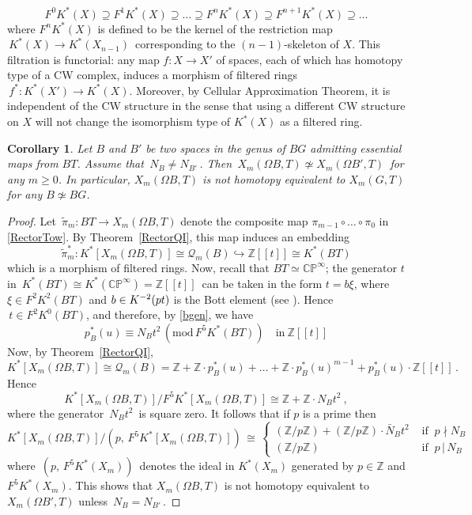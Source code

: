 \documentclass[11pt]{amsart}
\newtheorem{cor}[theorem]{Corollary}
\theoremstyle{definition}
\theoremstyle{remark}
\numberwithin{equation}{section}
\newcommand{\la}{\label}
\def\bP{\mathbb P}
\def\c{\mathbb{C}}
\def\cQ{\mathcal{Q}}
\def\Z{\mathbb{Z}}
\begin{document}
$$ F^0K^{\ast}(X) \supseteq F^1K^*(X) \supseteq \ldots \supseteq F^nK^*(X) \supseteq F^{n+1}K^*(X) \supseteq \ldots 
$$
%
where $F^n K^{\ast}(X)$ is defined to be the kernel of the restriction map $\,K^{\ast}(X) \to K^{\ast}(X_{n-1})\,$ corresponding to the $(n-1)$-skeleton of $X$. This filtration is functorial: any map $f: X \to X'$  of spaces, each of which has homotopy type of a CW complex, induces a morphism of filtered rings $\,f^\ast:K^{\ast}(X') \to K^{\ast}(X)$. Moreover, by  Cellular Approximation Theorem, it is independent of the CW structure in the sense that using a different CW structure on $X$ will not change the isomorphism type of $K^*(X)$ as a filtered ring.

\begin{cor} 
\la{rsdistinct}
Let $B$ and $B'$ be two spaces in the genus of $BG$ admitting essential maps from $ BT $. Assume that
$\,N_B \neq N_{B'}\,$. Then $\,X_m(\Omega B, T) \not\simeq X_m(\Omega B', T)\,$ for any $m \geq 0$. 
In particular, $ X_m(\Omega B,T)$ is not homotopy equivalent to $ X_m(G, T) $ for any $B \not\simeq BG $. 
\end{cor}
%
\begin{proof}
Let $\,\tilde{\pi}_m: BT \to X_m(\Omega B, T)$ denote 
the composite map $\pi_{m-1} \circ \ldots \circ \pi_0$
in \eqref{RectorTow}. By Theorem~\ref{RectorQI}, this map
induces an embedding
%
$$\tilde{\pi}_m^{\ast}: K^{\ast}[X_m(\Omega B, T)] \cong \cQ_{m}(B) \hookrightarrow \Z[[t]] \cong K^{\ast}(BT) 
$$
%
which is a morphism of filtered rings. Now, recall that
$ BT \simeq \c\bP^\infty $; the generator $t$ in $\,K^{\ast}(BT) \cong K^*(\c\bP^\infty) = \Z[[t]]\,$ can be taken in the form $ t = b \xi $, where $ \xi \in F^2 K^2(BT) $ and $ b \in K^{-2}({\rm pt})$ is the Bott element (see \cite[Sect. 3]{DY01}). Hence $\,t \in F^2K^0(BT) $, and therefore, by \eqref{bgen}, we have 
%
\begin{equation*}
\la{congB}
p_B^{\ast}(u) \equiv N_B t^2\, (\mathrm{mod}\, F^5K^{\ast}(BT))\quad \mbox{in}\ \Z[[t]] 
\end{equation*}
%
Now, by Theorem~\ref{RectorQI},
%
$$
K^{\ast}[X_m(\Omega B, T)] \cong \cQ_{m}(B) = \Z + \Z \cdot p_B^{\ast}(u) + \ldots + \Z \cdot p_B^{\ast}(u)^{m-1} +   p_B^{\ast}(u) \cdot \Z[[t]]\,.$$
%
Hence
$$
K^{\ast}[X_m(\Omega B, T)]/F^5K^{\ast}[X_m(\Omega B, T)] \cong \Z + \Z \cdot N_B  t^2\ ,
$$
%
where the generator $\,N_B t^2\,$ is square zero. It follows that if $p$ is a prime then 
%
$$ K^{\ast}[X_m(\Omega B, T)]/(p,\, F^5K^{\ast}[X_m(\Omega B, T)]) \, \cong \, \begin{cases} 
                   (\Z/p\Z) + (\Z/p\Z) \cdot \bar{N}_B t^2 & \text{ if }\ p \nmid N_B\\
                   (\Z/p\Z) & \text{ if }\ p\, |\,N_B
                   \end{cases} 
                   $$
%
where $\,(p,\,F^5K^*(X_m))\,$ denotes the ideal in $K^*(X_m)$ generated by $ p \in \Z $ and $F^5K^*(X_m)$.
This shows that $X_m(\Omega B, T)$ is not homotopy equivalent to $X_m(\Omega B', T)$ unless $\,N_B = N_{B'}\,$.
\end{proof}
\end{document}
